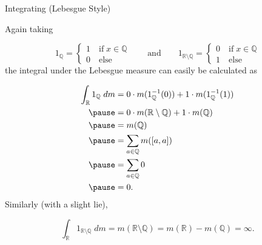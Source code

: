\documentclass[9pt]{beamer}
\begin{document}
    \begin{frame}{Integrating (Lebesgue Style)}

        Again taking

        \[1_\mathbb{Q}=\begin{cases}
            1\quad\text{if}\;x\in\mathbb{Q}\\
            0\quad\text{else}
        \end{cases}\quad\quad\text{and}\quad\quad 1_{\mathbb{R}\setminus\mathbb{Q}}=\begin{cases}
            0\quad\text{if}\;x\in\mathbb{Q}\\
            1\quad\text{else}
        \end{cases}\]\pause
        the integral under the Lebesgue measure can easily be calculated as

        \begin{align*}
            \int_\mathbb{R} 1_\mathbb{Q}\;dm&=0\cdot m(1_\mathbb{Q}^{-1}(0))+1\cdot m(1_\mathbb{Q}^{-1}(1))\\\pause
            &=0\cdot m(\mathbb{R}\setminus\mathbb{Q})+1\cdot m(\mathbb{Q})\\\pause
            &=m(\mathbb{Q})\\\pause
            &=\sum_{a\in\mathbb{Q}} m([a, a])\\\pause
            &=\sum_{a\in\mathbb{Q}}0\\\pause
            &=0.
        \end{align*}\pause
        Similarly (with a slight lie),

        \[\int_\mathbb{R} 1_{\mathbb{R}\setminus\mathbb{Q}}\;dm=m(\mathbb{R}\setminus\mathbb{Q})=m(\mathbb{R})-m(\mathbb{Q})=\infty.\]
        
    \end{frame}

    \addtocounter{theorem}{1}
\end{document}
